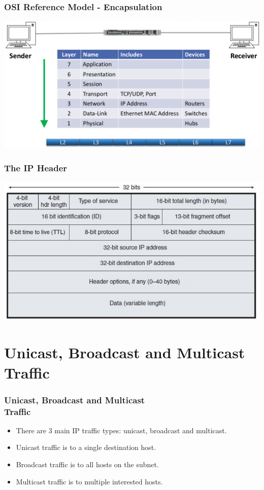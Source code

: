 \documentclass[pdflatex,compress]{beamer}
\begin{document}
\begin{frame}
	\frametitle{OSI Reference Model - Encapsulation}
	\begin{center}
		\includegraphics[width=\linewidth]{img/img08}
	\end{center}
\end{frame}

\begin{frame}
	\frametitle{The IP Header}
	\begin{center}
		\includegraphics[width=\linewidth]{img/img09}
	\end{center}
\end{frame}

\section{Unicast, Broadcast and Multicast Traffic}

\begin{frame}
	\frametitle{Unicast, Broadcast and Multicast \\Traffic}
	\begin{itemize}
		\item There are 3 main IP traffic types: unicast, broadcast and multicast.
		\item Unicast traffic is to a single destination host.
		\item Broadcast traffic is to all hosts on the subnet.
		\item Multicast traffic is to multiple interested hosts.
	\end{itemize}
\end{frame}
\end{document}
